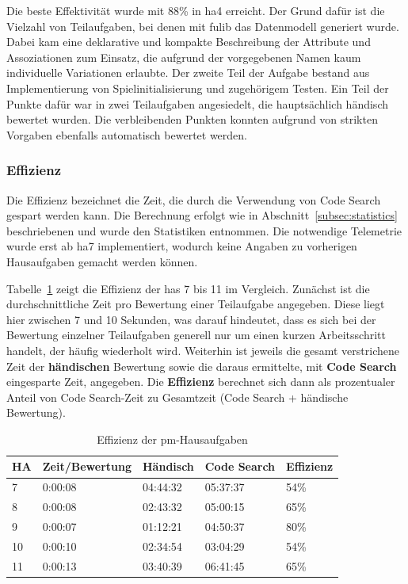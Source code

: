 Die beste Effektivität wurde mit 88\% in \ac{ha}4 erreicht.
Der Grund dafür ist die Vielzahl von Teilaufgaben, bei denen mit fulib das Datenmodell generiert wurde.
Dabei kam eine deklarative und kompakte Beschreibung der Attribute und Assoziationen zum Einsatz, die aufgrund der vorgegebenen Namen kaum individuelle Variationen erlaubte.
Der zweite Teil der Aufgabe bestand aus Implementierung von Spielinitialisierung und zugehörigem Testen.
Ein Teil der Punkte dafür war in zwei Teilaufgaben angesiedelt, die hauptsächlich händisch bewertet wurden.
Die verbleibenden Punkten konnten aufgrund von strikten Vorgaben ebenfalls automatisch bewertet werden.

\subsubsection{Effizienz}

Die Effizienz bezeichnet die Zeit, die durch die Verwendung von Code Search gespart werden kann.
Die Berechnung erfolgt wie in Abschnitt~\ref{subsec:statistics} beschriebenen und wurde den Statistiken entnommen.
Die notwendige Telemetrie wurde erst ab \ac{ha}7 implementiert, wodurch keine Angaben zu vorherigen Hausaufgaben gemacht werden können.

Tabelle~\ref{tbl:pm-efficiency} zeigt die Effizienz der \acp{ha} 7 bis 11 im Vergleich.
Zunächst ist die durchschnittliche Zeit pro Bewertung einer Teilaufgabe angegeben.
Diese liegt hier zwischen 7 und 10 Sekunden, was darauf hindeutet, dass es sich bei der Bewertung einzelner Teilaufgaben generell nur um einen kurzen Arbeitsschritt handelt, der häufig wiederholt wird.
Weiterhin ist jeweils die gesamt verstrichene Zeit der \textbf{händischen} Bewertung sowie die daraus ermittelte, mit \textbf{Code Search} eingesparte Zeit, angegeben.
Die \textbf{Effizienz} berechnet sich dann als prozentualer Anteil von Code Search-Zeit zu Gesamtzeit (Code Search + händische Bewertung).

\begin{table}
    \centering
    \caption{Effizienz der \ac{pm}-Hausaufgaben}
    \begin{tabular}{|l|l|l|l|l|}
    \hline
        HA  & Zeit/Bewertung & Händisch & Code Search & Effizienz \\ \hline
        7   & 0:00:08 & 04:44:32 & 05:37:37 & 54\% \\ \hline
        8   & 0:00:08 & 02:43:32 & 05:00:15 & 65\% \\ \hline
        9   & 0:00:07 & 01:12:21 & 04:50:37 & 80\% \\ \hline
        10  & 0:00:10 & 02:34:54 & 03:04:29 & 54\% \\ \hline
        11  & 0:00:13 & 03:40:39 & 06:41:45	& 65\% \\ \hline
    \end{tabular}
    \label{tbl:pm-efficiency}
\end{table}

